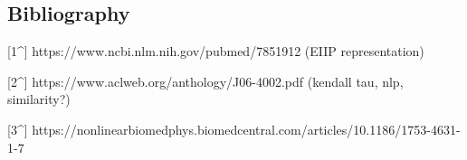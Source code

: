 \hypertarget{bibliography}{%
\subsection{Bibliography}\label{bibliography}}

{[}1\^{}{]} https://www.ncbi.nlm.nih.gov/pubmed/7851912 (EIIP
representation)

{[}2\^{}{]} https://www.aclweb.org/anthology/J06-4002.pdf (kendall tau,
nlp, similarity?)

{[}3\^{}{]}
https://nonlinearbiomedphys.biomedcentral.com/articles/10.1186/1753-4631-1-7
